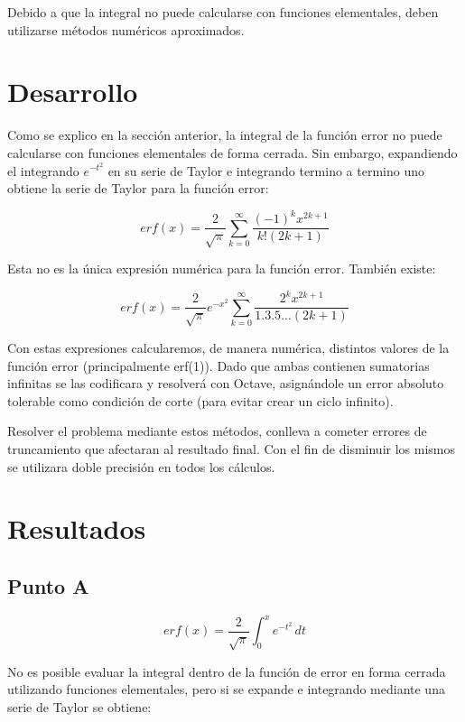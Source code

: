 \documentclass[a4paper]{article}
\begin{document}
Debido a que la integral no puede calcularse con funciones elementales, deben utilizarse métodos numéricos aproximados.

\section{Desarrollo}
Como se explico en la sección anterior, la integral de la función error no puede calcularse con funciones elementales de forma cerrada. Sin embargo, expandiendo el integrando $e^{-t^2}$ en su serie de Taylor e integrando termino a termino uno obtiene la serie de Taylor para la función error:

\begin{equation}
erf(x)=\frac{2}{\sqrt{\pi}}\sum_{k=0}^\infty
\frac{(-1)^k x^{2k+1}}{k! (2k+1)}
\end{equation}

Esta no es la única expresión numérica para la función error. También existe:

\begin{equation}
erf(x)=\frac{2}{\sqrt{\pi}}e^{-x^{2}}\sum_{k=0}^\infty
\frac{2^k x^{2k+1}}{1.3.5 ... (2k+1)}
\end{equation}

Con estas expresiones calcularemos, de manera numérica, distintos valores de la función error (principalmente erf(1)). Dado que ambas contienen sumatorias infinitas se las codificara y resolverá con Octave, asignándole un error absoluto tolerable como condición de corte (para evitar crear un ciclo infinito).

Resolver el problema mediante estos métodos, conlleva a cometer errores de truncamiento que afectaran al resultado final. Con el fin de disminuir los mismos se utilizara doble precisión en todos los cálculos.

\section{Resultados}

\subsection{Punto A}

\begin{equation}
erf(x)=\frac{2}{\sqrt{\pi}}\int_0^x e^{-t^2}\,dt
\end{equation}

No es posible evaluar la integral dentro de la función de error en forma cerrada utilizando funciones elementales, pero si se expande e integrando mediante una serie de Taylor se obtiene:
\end{document}
